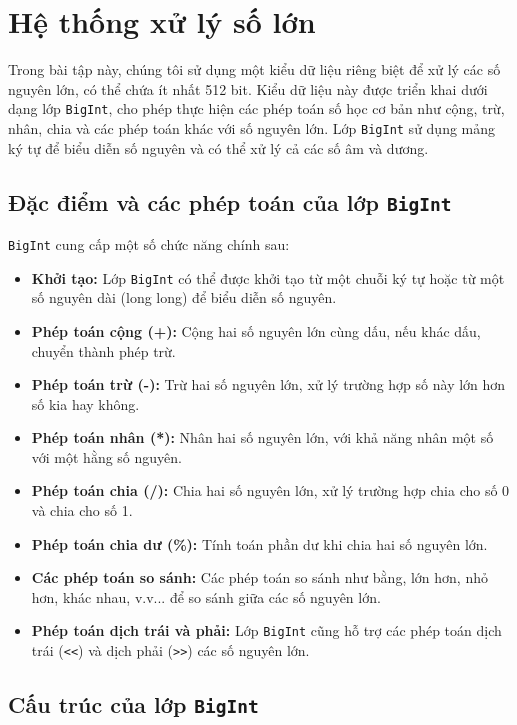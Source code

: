 \documentclass[a4paper,12pt]{article}
\begin{document}
\section{Hệ thống xử lý số lớn}

Trong bài tập này, chúng tôi sử dụng một kiểu dữ liệu riêng biệt để xử lý các số nguyên lớn, có thể chứa ít nhất 512 bit. Kiểu dữ liệu này được triển khai dưới dạng lớp \texttt{BigInt}, cho phép thực hiện các phép toán số học cơ bản như cộng, trừ, nhân, chia và các phép toán khác với số nguyên lớn. Lớp \texttt{BigInt} sử dụng mảng ký tự để biểu diễn số nguyên và có thể xử lý cả các số âm và dương.

\subsection{Đặc điểm và các phép toán của lớp \texttt{BigInt}}

\texttt{BigInt} cung cấp một số chức năng chính sau:

\begin{itemize}
    \item \textbf{Khởi tạo:} Lớp \texttt{BigInt} có thể được khởi tạo từ một chuỗi ký tự hoặc từ một số nguyên dài (long long) để biểu diễn số nguyên.
    \item \textbf{Phép toán cộng (+):} Cộng hai số nguyên lớn cùng dấu, nếu khác dấu, chuyển thành phép trừ.
    \item \textbf{Phép toán trừ (-):} Trừ hai số nguyên lớn, xử lý trường hợp số này lớn hơn số kia hay không.
    \item \textbf{Phép toán nhân (*):} Nhân hai số nguyên lớn, với khả năng nhân một số với một hằng số nguyên.
    \item \textbf{Phép toán chia (/):} Chia hai số nguyên lớn, xử lý trường hợp chia cho số 0 và chia cho số 1.
    \item \textbf{Phép toán chia dư (\%):} Tính toán phần dư khi chia hai số nguyên lớn.
    \item \textbf{Các phép toán so sánh:} Các phép toán so sánh như bằng, lớn hơn, nhỏ hơn, khác nhau, v.v... để so sánh giữa các số nguyên lớn.
    \item \textbf{Phép toán dịch trái và phải:} Lớp \texttt{BigInt} cũng hỗ trợ các phép toán dịch trái (\texttt{<<}) và dịch phải (\texttt{>>}) các số nguyên lớn.
\end{itemize}

\subsection{Cấu trúc của lớp \texttt{BigInt}}
\end{document}
